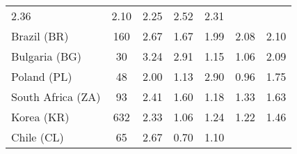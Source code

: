 \begin{table}[t]
{\begin{tabular}{lcccccc}
    \color[HTML]{000000}
    \color{black} 2.36 & {\cellcolor[HTML]{F7FBFF}} \color[HTML]{000000}
    \color{black} 2.10 & {\cellcolor[HTML]{D6E5F4}} \color[HTML]{000000}
    \color{black} 2.25 & {\cellcolor[HTML]{6AAED6}} \color[HTML]{F1F1F1}
    \color{black} 2.52 & \color{black} 2.31 \\
    Brazil (BR) & \color{black} 160 & {\cellcolor[HTML]{6AAED6}}
    \color[HTML]{F1F1F1} \color{black} 2.67 & {\cellcolor[HTML]{F7FBFF}}
    \color[HTML]{000000} \color{black} 1.67 & {\cellcolor[HTML]{D8E7F5}}
    \color[HTML]{000000} \color{black} 1.99 & {\cellcolor[HTML]{CFE1F2}}
    \color[HTML]{000000} \color{black} 2.08 & \color{black} 2.10 \\
    Bulgaria (BG) & \color{black} 30 & {\cellcolor[HTML]{6AAED6}}
    \color[HTML]{F1F1F1} \color{black} 3.24 & {\cellcolor[HTML]{89BEDC}}
    \color[HTML]{000000} \color{black} 2.91 & {\cellcolor[HTML]{F4F9FE}}
    \color[HTML]{000000} \color{black} 1.15 & {\cellcolor[HTML]{F7FBFF}}
    \color[HTML]{000000} \color{black} 1.06 & \color{black} 2.09 \\
    \midrule
    Poland (PL) & \color{black} 48 & {\cellcolor[HTML]{C1D9ED}}
    \color[HTML]{000000} \color{black} 2.00 & {\cellcolor[HTML]{EEF5FC}}
    \color[HTML]{000000} \color{black} 1.13 & {\cellcolor[HTML]{6AAED6}}
    \color[HTML]{F1F1F1} \color{black} 2.90 & {\cellcolor[HTML]{F7FBFF}}
    \color[HTML]{000000} \color{black} 0.96 & \color{black} 1.75 \\
    South Africa (ZA) & \color{black} 93 & {\cellcolor[HTML]{6AAED6}}
    \color[HTML]{F1F1F1} \color{black} 2.41 & {\cellcolor[HTML]{D5E5F4}}
    \color[HTML]{000000} \color{black} 1.60 & {\cellcolor[HTML]{F7FBFF}}
    \color[HTML]{000000} \color{black} 1.18 & {\cellcolor[HTML]{EBF3FB}}
    \color[HTML]{000000} \color{black} 1.33 & \color{black} 1.63 \\
    Korea (KR) & \color{black} 632 & {\cellcolor[HTML]{6AAED6}}
    \color[HTML]{F1F1F1} \color{black} 2.33 & {\cellcolor[HTML]{F7FBFF}}
    \color[HTML]{000000} \color{black} 1.06 & {\cellcolor[HTML]{E8F1FA}}
    \color[HTML]{000000} \color{black} 1.24 & {\cellcolor[HTML]{EAF3FB}}
    \color[HTML]{000000} \color{black} 1.22 & \color{black} 1.46 \\
    Chile (CL) & \color{black} 65 & {\cellcolor[HTML]{6CAED6}}
    \color[HTML]{F1F1F1}
    \color{black} 2.67 & {\cellcolor[HTML]{F7FBFF}} \color[HTML]{000000}
    \color{black} 0.70 & {\cellcolor[HTML]{E3EEF9}} \color[HTML]{000000}
    \color{black} 1.10 & {\cellcolor[HTML]{F3F8FE}} \color[HTML]{000000}

\end{tabular}}
\end{table}
